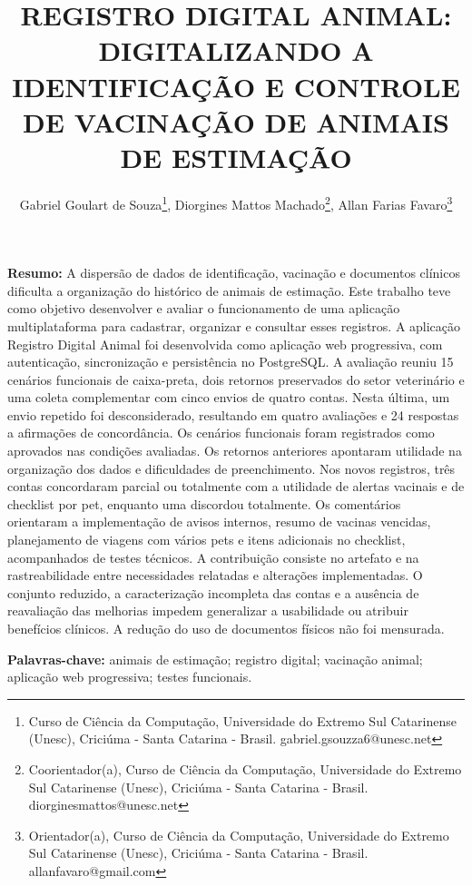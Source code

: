 \documentclass{UNESC}
\title{REGISTRO DIGITAL ANIMAL: DIGITALIZANDO A IDENTIFICAÇÃO E CONTROLE DE VACINAÇÃO DE ANIMAIS DE ESTIMAÇÃO}
\author
{
   Gabriel Goulart de Souza\footnote{Curso de Ciência da Computação, Universidade do Extremo Sul Catarinense (Unesc), Criciúma - Santa Catarina - Brasil. gabriel.gsouzza6@unesc.net},
   Diorgines Mattos Machado\footnote{Coorientador(a), Curso de Ciência da Computação, Universidade do Extremo Sul Catarinense (Unesc), Criciúma - Santa Catarina - Brasil. diorginesmattos@unesc.net},
   Allan Farias Favaro\footnote{Orientador(a), Curso de Ciência da Computação, Universidade do Extremo Sul Catarinense (Unesc), Criciúma - Santa Catarina - Brasil. allanfavaro@gmail.com}
}
\begin{document}
\onehalfspacing

\maketitle

\noindent
\textbf{Resumo:} A dispersão de dados de identificação, vacinação e documentos clínicos dificulta a organização do histórico de animais de estimação. Este trabalho teve como objetivo desenvolver e avaliar o funcionamento de uma aplicação multiplataforma para cadastrar, organizar e consultar esses registros. A aplicação Registro Digital Animal foi desenvolvida como aplicação web progressiva, com autenticação, sincronização e persistência no PostgreSQL. A avaliação reuniu 15 cenários funcionais de caixa-preta, dois retornos preservados do setor veterinário e uma coleta complementar com cinco envios de quatro contas. Nesta última, um envio repetido foi desconsiderado, resultando em quatro avaliações e 24 respostas a afirmações de concordância. Os cenários funcionais foram registrados como aprovados nas condições avaliadas. Os retornos anteriores apontaram utilidade na organização dos dados e dificuldades de preenchimento. Nos novos registros, três contas concordaram parcial ou totalmente com a utilidade de alertas vacinais e de checklist por pet, enquanto uma discordou totalmente. Os comentários orientaram a implementação de avisos internos, resumo de vacinas vencidas, planejamento de viagens com vários pets e itens adicionais no checklist, acompanhados de testes técnicos. A contribuição consiste no artefato e na rastreabilidade entre necessidades relatadas e alterações implementadas. O conjunto reduzido, a caracterização incompleta das contas e a ausência de reavaliação das melhorias impedem generalizar a usabilidade ou atribuir benefícios clínicos. A redução do uso de documentos físicos não foi mensurada.

\vspace{0.5em}
\noindent
\textbf{Palavras-chave:} animais de estimação; registro digital; vacinação animal; aplicação web progressiva; testes funcionais.
\end{document}
